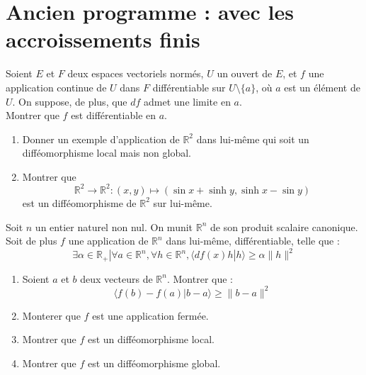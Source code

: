 \section{Ancien programme : avec les accroissements finis}

\begin{exer}
Soient $E$ et $F$ deux espaces vectoriels normés, $U$ un ouvert de $E$, %
et $f$ une application continue de $U$ dans $F$ différentiable sur $U \setminus \{ a \}$, où $a$ est un élément de $U$. %
On suppose, de plus, que $df$ admet une limite en $a$.\\
Montrer que $f$ est différentiable en $a$.
\end{exer}

\begin{exer}
\begin{enumerate}
\item Donner un exemple d'application de $\mathbb{R}^2$ dans lui-même qui soit un difféomorphisme local mais non global.
\item Montrer que \[\mathbb{R}^2 \rightarrow \mathbb{R}^2 : (x,y) \mapsto (\sin x + \sinh y, \sinh x - \sin y)\]
est un difféomorphisme de $\mathbb{R}^2$ sur lui-même.
\end{enumerate}
\end{exer}

\begin{exer}
Soit $n$ un entier naturel non nul. On munit $\mathbb{R}^n$ de son produit scalaire canonique. %
Soit de plus $f$ une application de $\mathbb{R}^n$ dans lui-même, différentiable, telle que :
\[\exists \alpha \in \mathbb{R}_+ | \forall a \in \mathbb{R}^n , \forall h \in \mathbb{R}^n , \langle df(x)h | h \rangle \geq \alpha \| h \|^2\]
\begin{enumerate}
\item Soient $a$ et $b$ deux vecteurs de $\mathbb{R}^n$. Montrer que :
\[\langle f(b)-f(a) | b-a \rangle \geq \| b-a \|^2\]
\item Monterer que $f$ est une application fermée.
\item Montrer que $f$ est un difféomorphisme local.
\item Montrer que $f$ est un difféomorphisme global.
\end{enumerate}
\end{exer}

